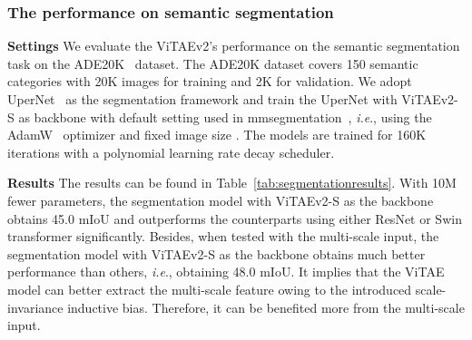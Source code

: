\documentclass[twocolumn]{svjour3}          \smartqed  \usepackage{natbib}
\newcommand{\ie}{i.e}
\def\onedot{.\xspace}
\def\ie{\emph{i.e}\onedot}
\begin{document}
\begin{table}[htbp]
  \centering
\caption{Semantic segmentation results on the ADE20k~\citep{zhou2017scene} validation set regarding different backbones including ResNet-50~\citep{he2016deep}, Swin-T~\citep{liu2021swin}, DAT-T~\citep{xia2022vision}, and our ViTAEv2-S. MS denotes that multi-scale inputs are used during testing.}
    \label{tab:segmentationresults}\end{table}


\subsubsection{The performance on semantic segmentation}

\textbf{Settings} We evaluate the ViTAEv2's performance on the semantic segmentation task on the ADE20K~\citep{zhou2017scene,zhou2019semantic} dataset. The ADE20K dataset covers 150 semantic categories with 20K images for training and 2K for validation. We adopt UperNet~\citep{xiao2018unified} as the segmentation framework and train the UperNet with ViTAEv2-S as backbone with default setting used in mmsegmentation~\citep{mmseg2020}, \ie, using the AdamW~\citep{loshchilov2017decoupled} optimizer and fixed image size . The models are trained for 160K iterations with a polynomial learning rate decay scheduler. 

\noindent \textbf{Results} The results can be found in Table~\ref{tab:segmentationresults}. With 10M fewer parameters, the segmentation model with ViTAEv2-S as the backbone obtains 45.0 mIoU and outperforms the counterparts using either ResNet or Swin transformer significantly. Besides, when tested with the multi-scale input, the segmentation model with ViTAEv2-S as the backbone obtains much better performance than others, \ie, obtaining 48.0 mIoU. It implies that the ViTAE model can better extract the multi-scale feature owing to the introduced scale-invariance inductive bias. Therefore, it can be benefited more from the multi-scale input.
\end{document}
